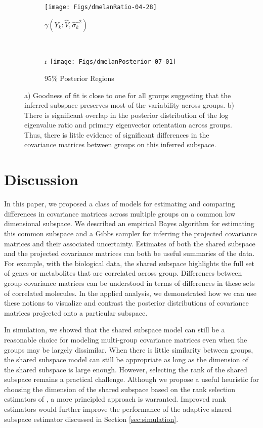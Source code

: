 \documentclass[12pt]{article}
\begin{document}
\begin{figure}[t]
    \centering
    \begin{subfigure}[b]{0.45\textwidth}
        \texttt{[image: Figs/dmelanRatio-04-28]}
        \caption{$\gamma(Y_k: \hat{V}, \hat{\sigma_k}^2)$}
        \label{fig:dmelanRatio}
      \end{subfigure}
    ~ %
    \begin{subfigure}[b]{0.45\textwidth}r
        \texttt{[image: Figs/dmelanPosterior-07-01]}
        \caption{95\% Posterior Regions}
        \label{fig:dmelanPosterior}
    \end{subfigure}
    \caption{a) Goodness of fit is close to one for all groups
      suggesting that the inferred subspace preserves most of the
      variability across groups. b) There is significant overlap in
      the posterior distribution of the log eigenvalue ratio and primary
      eigenvector orientation across groups. Thus, there is little
      evidence of significant differences in the covariance matrices
      between groups on this inferred subspace.  }
\end{figure}

\section{Discussion}

In this paper, we proposed a class of models for estimating and
comparing differences in covariance matrices across multiple groups on
a common low dimensional subspace.  We described an empirical Bayes
algorithm for estimating this common subspace and a Gibbs sampler for
inferring the projected covariance matrices and their associated
uncertainty.  Estimates of both the shared subspace and the projected
covariance matrices can both be useful summaries of the data.  For
example, with the biological data, the shared subspace highlights the
full set of genes or metabolites that are correlated across group.
Differences between group covariance matrices can be understood in
terms of differences in these sets of correlated molecules.  In the applied analysis, we demonstrated how
we can use these notions to visualize and contrast the posterior
distributions of covariance matrices projected onto a particular
subspace.

In simulation, we showed that the shared subspace model can still be a
reasonable choice for modeling multi-group covariance matrices even
when the groups may be largely dissimilar.  When there is little
similarity between groups, the shared subspace model can still be appropriate as
long as the dimension of the shared subspace is large enough.
However, selecting the rank of the shared subspace remains a practical
challenge.  Although we propose a useful heuristic for choosing the
dimension of the shared subspace based on the rank selection
estimators of \citet{Gavish2014}, a more principled approach is
warranted.  Improved rank estimators would further improve the
performance of the adaptive shared subspace estimator discussed in
Section \ref{sec:simulation}.
\end{document}
